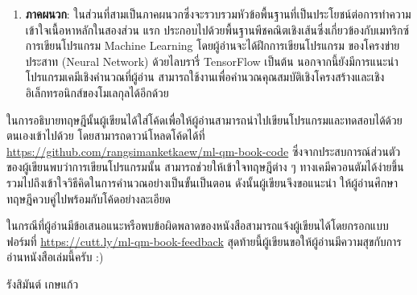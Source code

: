 {\begin{enumerate}[topsep=0pt]
    \item \textbf{ภาคผนวก}: ในส่วนที่สามเป็นภาคผนวกซึ่งจะรวบรวมหัวข้อพื้นฐานที่เป็นประโยชน์ต่อการทำความเข้าใจเนื้อหาหลักในสองส่วน%
    แรก ประกอบไปด้วยพื้นฐานพีชคณิตเชิงเส้นซึ่งเกี่ยวข้องกับเมทริกซ์ การเขียนโปรแกรม Machine Learning โดยผู้อ่านจะได้ฝึกการเขียนโปรแกรม%
    ของโครงข่ายประสาท (Neural Network) ด้วยไลบรารี่ TensorFlow เป็นต้น นอกจากนี้ยังมีการแนะนำโปรแกรมเคมีเชิงคำนวณที่ผู้อ่าน%
    สามารถใช้งานเพื่อคำนวณคุณสมบัติเชิงโครงสร้างและเชิงอิเล็กทรอนิกส์ของโมเลกุลได้อีกด้วย
\end{enumerate}

ในการอธิบายทฤษฎีนั้นผู้เขียนได้ใส่โค้ดเพื่อให้ผู้อ่านสามารถนำไปเขียนโปรแกรมและทดสอบได้ด้วยตนเองเข้าไปด้วย โดยสามารถดาวน์โหลดโค้ดได้ที่ 
\url{https://github.com/rangsimanketkaew/ml-qm-book-code} ซึ่งจากประสบการณ์ส่วนตัวของผู้เขียนพบว่าการเขียนโปรแกรมนั้น%
สามารถช่วยให้เข้าใจทฤษฎีต่าง ๆ ทางเคมีควอนตัมได้ง่ายขึ้น รวมไปถึงเข้าใจวิธีคิดในการคำนวณอย่างเป็นขั้นเป็นตอน ดังนั้นผู้เขียนจึงขอแนะนำ%
ให้ผู้อ่านศึกษาทฤษฎีควบคู่ไปพร้อมกับโค้ดอย่างละเอียด

ในกรณีที่ผู้อ่านมีข้อเสนอแนะหรือพบข้อผิดพลาดของหนังสือสามารถแจ้งผู้เขียนได้โดยกรอกแบบฟอร์มที่ 
\url{https://cutt.ly/ml-qm-book-feedback} สุดท้ายนี้ผู้เขียนขอให้ผู้อ่านมีความสุขกับการอ่านหนังสือเล่มนี้ครับ :)

\medskip

\begin{flushright}
รังสิมันต์ เกษแก้ว
\end{flushright}
}
